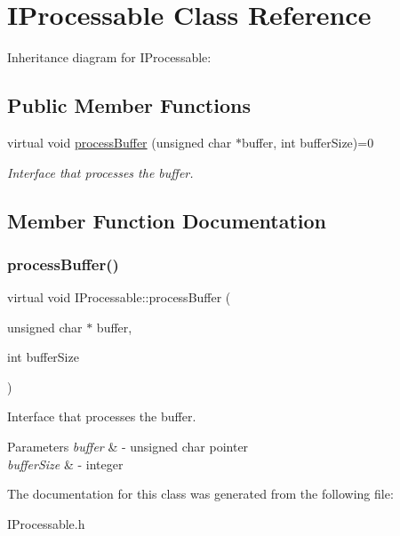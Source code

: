 \hypertarget{classIProcessable}{}\section{I\+Processable Class Reference}
\label{classIProcessable}


Inheritance diagram for I\+Processable\+:
\subsection*{Public Member Functions}
\begin{DoxyCompactItemize}
\item 
virtual void \hyperlink{classIProcessable_aba2a96a03e596c8576b76919b52741db}{process\+Buffer} (unsigned char $\ast$buffer, int buffer\+Size)=0
\begin{DoxyCompactList}\small\item\em Interface that processes the buffer. \end{DoxyCompactList}\end{DoxyCompactItemize}


\subsection{Member Function Documentation}
\mbox{\label{classIProcessable_aba2a96a03e596c8576b76919b52741db}} 
\subsubsection{\texorpdfstring{process\+Buffer()}{processBuffer()}}
{\footnotesize\ttfamily virtual void I\+Processable\+::process\+Buffer (\begin{DoxyParamCaption}\item[{unsigned char $\ast$}]{buffer,  }\item[{int}]{buffer\+Size }\end{DoxyParamCaption})\hspace{0.3cm}{\ttfamily [pure virtual]}}



Interface that processes the buffer. 


\begin{DoxyParams}{Parameters}
{\em buffer} & -\/ unsigned char pointer \\
\hline
{\em buffer\+Size} & -\/ integer \\
\hline
\end{DoxyParams}


The documentation for this class was generated from the following file\+:\begin{DoxyCompactItemize}
\item 
I\+Processable.\+h\end{DoxyCompactItemize}

